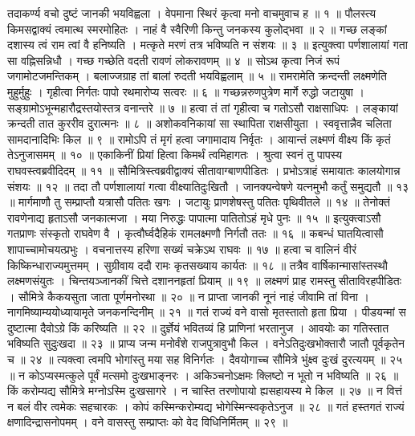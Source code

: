तदाकर्ण्य वचो दुष्टं जानकी भयविह्वला ।
वेपमाना स्थिरं कृत्वा मनो वाचमुवाच ह ॥ १ ॥
पौलस्त्य किमसद्वाक्यं त्वमात्थ स्मरमोहितः ।
नाहं वै स्वैरिणी किन्तु जनकस्य कुलोद्‌भवा ॥ २ ॥
गच्छ लङ्कां दशास्य त्वं राम त्वां वै हनिष्यति ।
मत्कृते मरणं तत्र भविष्यति न संशयः ॥ ३ ॥
इत्युक्त्वा पर्णशालायां गता सा वह्निसन्निधौ ।
गच्छ गच्छेति वदती रावणं लोकरावणम् ॥ ४ ॥
सोऽथ कृत्वा निजं रूपं जगामोटजमन्तिकम् ।
बलाज्जग्राह तां बालां रुदती भयविह्वलाम् ॥ ५ ॥
रामरामेति क्रन्दन्ती लक्ष्मणेति मुहुर्मुहुः ।
गृहीत्वा निर्गतः पापो रथमारोप्य सत्वरः ॥ ६ ॥
गच्छन्नरुणपुत्रेण मार्गे रुद्धो जटायुषा ।
सङ्ग्रामोऽभून्महारौद्रस्तयोस्तत्र वनान्तरे ॥ ७ ॥
हत्वा तं तां गृहीत्वा च गतोऽसौ राक्षसाधिपः ।
लङ्कायां क्रन्दती तात कुररीव दुरात्मनः ॥ ८ ॥
अशोकवनिकायां सा स्थापिता राक्षसीयुता ।
स्ववृत्तान्नैव चलिता सामदानादिभिः किल ॥ ९ ॥
रामोऽपि तं मृगं हत्वा जगामादाय निर्वृतः ।
आयान्तं लक्ष्मणं वीक्ष्य किं कृतं तेऽनुजासमम् ॥ १० ॥
एकाकिनीं प्रियां हित्वा किमर्थं त्वमिहागतः ।
श्रुत्वा स्वनं तु पापस्य राघवस्त्वब्रवीदिदम् ॥ ११ ॥
सौ‌मित्रिस्त्वब्रवीद्वाक्यं सीतावाग्बाणपीडितः ।
प्रभोऽत्राहं समायातः कालयोगान्न संशयः ॥ १२ ॥
तदा तौ पर्णशालायां गत्वा वीक्ष्यातिदुःखितौ ।
जानक्यन्वेषणे यत्‍नमुभौ कर्तुं समुद्यतौ ॥ १३ ॥
मार्गमाणौ तु सम्प्राप्तौ यत्रासौ पतितः खगः ।
जटायुः प्राणशेषस्तु पतितः पृथिवीतले ॥ १४ ॥
तेनोक्तं रावणेनाद्य हृता‍‍ऽसौ जनकात्मजा ।
मया निरुद्धः पापात्मा पातितोऽहं मृधे पुनः ॥ १५ ॥
इत्युक्त्वाऽसौ गतप्राणः संस्कृतो राघवेण वै ।
कृत्वौर्घ्वदैहिकं रामलक्ष्मणौ निर्गतौ ततः ॥ १६ ॥
कबन्धं घातयित्वासौ शापाच्चामोचयत्प्रभुः ।
वचनात्तस्य हरिणा सख्यं चक्रेऽथ राघवः ॥ १७ ॥
हत्वा च वालिनं वीरं किष्किन्धाराज्यमुत्तमम् ।
सुग्रीवाय ददौ रामः कृतसख्याय कार्यतः ॥ १८ ॥
तत्रैव वार्षिकान्मासांस्तस्थौ लक्ष्मणसंयुतः ।
चिन्तयञ्जानकीं चित्ते दशाननहृतां प्रियाम् ॥ १९ ॥
लक्ष्मणं प्राह रामस्तु सीताविरहपीडितः ।
सौ‌मित्रे कैकयसुता जाता पूर्णमनोरथा ॥ २० ॥
न प्राप्ता जानकी नूनं नाहं जीवामि तां विना ।
नागमिष्याम्ययोध्यायामृते जनकनन्दिनीम् ॥ २१ ॥
गतं राज्यं वने वासो मृतस्तातो हृता प्रिया ।
पीडयन्मां स दुष्टात्मा दैवो‍ऽग्रे किं करिष्यति ॥ २२ ॥
दुर्ज्ञेयं भवितव्यं हि प्राणिनां भरतानुज ।
आवयोः का गतिस्तात भविष्यति सुदुःखदा ॥ २३ ॥
प्राप्य जन्म मनोर्वंशे राजपुत्रावुभौ किल ।
वनेऽतिदुःखभोक्तारौ जातौ पूर्वकृतेन च ॥ २४ ॥
त्यक्त्वा त्वमपि भोगांस्तु मया सह विनिर्गतः ।
दैवयोगाच्च सौ‌मित्रे भुंक्ष्व दुःखं दुरत्ययम् ॥ २५ ॥
न कोऽप्यस्मत्कुले पूर्वं मत्समो दुःखभाङ्नरः ।
अकिञ्चनोऽक्षमः क्लिष्टो न भूतो न भविष्यति ॥ २६ ॥
किं करोम्यद्य सौ‌मित्रे मग्नोऽस्मि दुःखसागरे ।
न चास्ति तरणोपायो ह्यसहायस्य मे किल ॥ २७ ॥
न वित्तं न बलं वीर त्वमेकः सहचारकः ।
कोपं कस्मिन्करोम्यद्य भोगेस्मिन्स्वकृतेऽनुज ॥ २८ ॥
गतं हस्तगतं राज्यं क्षणादिन्द्रासनोपमम् ।
वने वासस्तु सम्प्राप्तः को वेद विधिनिर्मितम् ॥ २९ ॥
